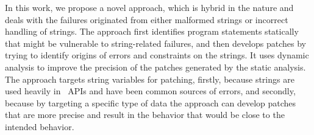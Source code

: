 In this work, we propose a novel approach, which is hybrid in the nature and
deals with the failures originated from either malformed strings or incorrect
handling of strings. The approach first identifies program statements statically
that might be vulnerable to string-related failures, and then develops patches
by trying to identify origins of errors and constraints on the strings. It uses dynamic
analysis to improve the precision of the patches generated by the static
analysis. The approach targets string variables for patching, firstly, because
strings are used heavily in \java\ APIs and have been common sources
of errors, and secondly, because by targeting a specific type of data
the approach can develop patches that are more precise and result in the
behavior that would be close to the intended behavior. %

